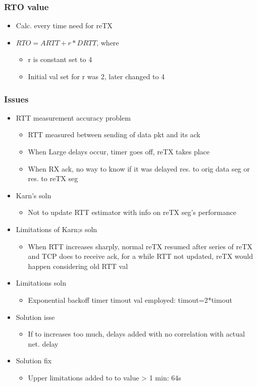 \documentclass[a4paper]{article}
\begin{document}
\subsubsection{RTO value}
\begin{itemize}
	\item Calc. every time need for reTX
	\item $RTO = ARTT+r*DRTT$, where
	\begin{itemize}
		\item r is constant set to 4
		\item Initial val set for r was 2, later changed to 4
	\end{itemize}
\end{itemize}
\subsubsection{Issues}
\begin{itemize}
	\item RTT measurement accuracy problem
	\begin{itemize}
	 	\item RTT measured between sending of data pkt and its ack
		\item When Large delays occur, timer goes off, reTX takes place
		\item When RX ack, no way to know if it was delayed res. to orig data
			seg or res. to reTX seg
	\end{itemize}
	\item Karn's soln
	\begin{itemize}
		\item Not to update RTT estimator with info on reTX seg's
			performance
	\end{itemize}
	\item Limitations of Karn;s soln
	\begin{itemize}
		\item When RTT increases sharply, normal reTX resumed after
			series of reTX and TCP does to receive ack, for a while
			RTT not updated, reTX would happen considering old RTT
			val
	\end{itemize}
	\item Limitations soln
	\begin{itemize}
		\item Exponential backoff timer timout val employed:
			timout=2*timout
	\end{itemize}
	\item Solution isse
		\begin{itemize}
			\item If to increases too much, delays added with no
				correlation with actual net. delay
		\end{itemize}
	\item Solution fix
	\begin{itemize}
		\item Upper limitations added to to value > 1 min: 64s
	\end{itemize}
\end{itemize}
\end{document}
